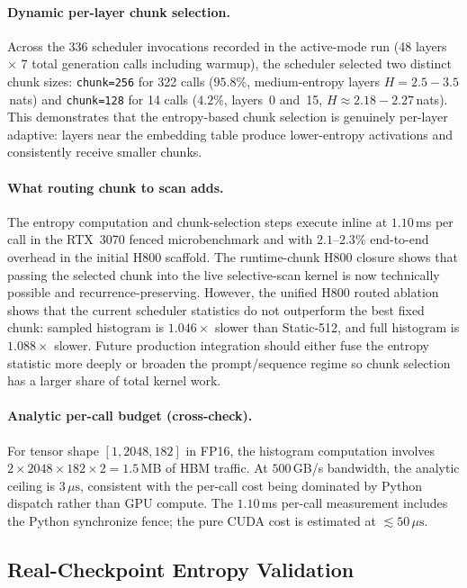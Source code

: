 \paragraph{Dynamic per-layer chunk selection.}
Across the 336 scheduler invocations recorded in the active-mode run (48 layers $\times$ 7 total generation calls including warmup), the scheduler selected two distinct chunk sizes: \texttt{chunk=256} for 322 calls ($95.8\%$, medium-entropy layers $H{=}2.5{-}3.5$\,nats) and \texttt{chunk=128} for 14 calls ($4.2\%$, layers~0 and~15, $H{\approx}2.18{-}2.27$\,nats). This demonstrates that the entropy-based chunk selection is genuinely per-layer adaptive: layers near the embedding table produce lower-entropy activations and consistently receive smaller chunks.

\paragraph{What routing chunk to scan adds.}
The entropy computation and chunk-selection steps execute inline at $1.10$\,ms per call in the RTX~3070 fenced microbenchmark and with $2.1$--$2.3\%$ end-to-end overhead in the initial H800 scaffold. The runtime-chunk H800 closure shows that passing the selected chunk into the live selective-scan kernel is now technically possible and recurrence-preserving. However, the unified H800 routed ablation shows that the current scheduler statistics do not outperform the best fixed chunk: sampled histogram is $1.046\times$ slower than Static-512, and full histogram is $1.088\times$ slower. Future production integration should either fuse the entropy statistic more deeply or broaden the prompt/sequence regime so chunk selection has a larger share of total kernel work.

\paragraph{Analytic per-call budget (cross-check).}
For tensor shape $[1, 2048, 182]$ in FP16, the histogram computation involves $2 \times 2048 \times 182 \times 2 = 1.5$\,MB of HBM traffic. At $500$\,GB/s bandwidth, the analytic ceiling is $3\,\mu\text{s}$, consistent with the per-call cost being dominated by Python dispatch rather than GPU compute. The $1.10$\,ms per-call measurement includes the Python synchronize fence; the pure CUDA cost is estimated at ${\lesssim}50\,\mu\text{s}$.

\subsection{Real-Checkpoint Entropy Validation}
\label{sec:real_checkpoint_entropy}

